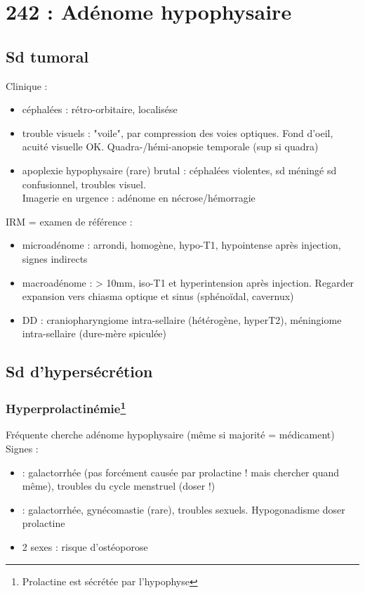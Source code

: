 \documentclass[11pt]{article}
\begin{document}
\section{242 : Adénome hypophysaire}
\label{sec:org35e014a}
\subsection{Sd tumoral}
\label{sec:org6035ac2}
Clinique : 
\begin{itemize}
\item céphalées : rétro-orbitaire, localisése
\item trouble visuels : "voile", par compression des voies optiques. Fond d'oeil,
acuité visuelle OK. Quadra-/hémi-anopsie temporale (sup si quadra)
\item apoplexie hypophysaire (rare) brutal : céphalées violentes, sd méningé sd
 confusionnel, troubles visuel.\\
Imagerie en urgence \danger : adénome en nécrose/hémorragie \skull
\end{itemize}

IRM = examen de référence :
\begin{itemize}
\item microadénome : arrondi, homogène, hypo-T1, hypointense  après injection,
signes indirects
\item macroadénome :  > 10mm, iso-T1 et hyperintension après injection. Regarder
expansion vers chiasma optique et sinus (sphénoïdal, cavernux)
\item DD : craniopharyngiome intra-sellaire (hétérogène, hyperT2), méningiome
intra-sellaire (dure-mère spiculée)
\end{itemize}

\subsection{Sd d'hypersécrétion}
\label{sec:org5c403b7}
\subsubsection{Hyperprolactinémie\footnote{Prolactine est sécrétée par l'hypophyse}}
\label{sec:org2ad2933}
Fréquente \thus cherche adénome hypophysaire (même si majorité = médicament)
Signes :
\begin{itemize}
\item \female : galactorrhée (pas forcément causée par prolactine ! mais chercher
quand même), troubles du cycle menstruel (doser !)
\item \male : galactorrhée, gynécomastie (rare), troubles sexuels. Hypogonadisme
\thus doser prolactine
\item 2 sexes : risque d'ostéoporose
\end{itemize}
\end{document}
